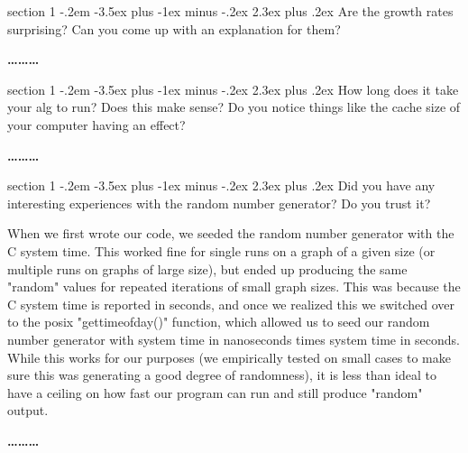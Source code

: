 \documentclass[12pt]{article}
\makeatletter
\newenvironment{problem}{\@startsection
       {section}
       {1}
       {-.2em}
       {-3.5ex plus -1ex minus -.2ex}
       {2.3ex plus .2ex}
       {\pagebreak[3]%
       \large\bf\noindent{Problem }
       }
       }
       {%
       \begin{center}\large\bf \ldots\ldots\ldots\end{center}}
\makeatother
\begin{document}
\begin{problem}{}
Are the growth rates surprising? Can you come up with an explanation
for them?

\end{problem}

\begin{problem}{}
How long does it take your alg to run? Does this make sense? Do you
notice things like the cache size of your computer having an effect?

\end{problem}

\begin{problem}{}
Did you have any interesting experiences with the random number
generator? Do you trust it?

When we first wrote our code, we seeded the random number generator with the C system time.  This worked fine for single runs on a graph of a given size (or multiple runs on graphs of large size), but ended up producing the same "random" values for repeated iterations of small graph sizes.  This was because the C system time is reported in seconds, and once we realized this we switched over to the posix "gettimeofday()" function, which allowed us to seed our random number generator with system time in nanoseconds times system time in seconds.  While this works for our purposes (we empirically tested on small cases to make sure this was generating a good degree of randomness), it is less than ideal to have a ceiling on how fast our program can run and still produce "random" output.  

\end{problem}

\end{document}
